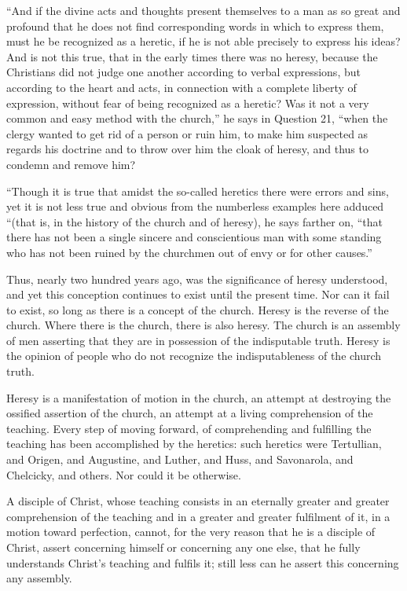 \documentclass{book}
\begin{document}
“And if the divine acts and thoughts present themselves to a man as so great and profound that he does not find corresponding words in which to express them, must he be recognized as a heretic, if he is not able precisely to express his ideas? And is not this true, that in the early times there was no heresy, because the Christians did not judge one another according to verbal expressions, but according to the heart and acts, in connection with a complete liberty of expression, without fear of being recognized as a heretic? Was it not a very common and easy method with the church,” he says in Question 21, “when the clergy wanted to get rid of a person or ruin him, to make him suspected as regards his doctrine and to throw over him the cloak of heresy, and thus to condemn and remove him?

“Though it is true that amidst the so-called heretics there were errors and sins, yet it is not less true and obvious from the numberless examples here adduced “(that is, in the history of the church and of heresy), he says farther on, “that there has not been a single sincere and conscientious man with some standing who has not been ruined by the churchmen out of envy or for other causes.”

Thus, nearly two hundred years ago, was the significance of heresy understood, and yet this conception continues to exist until the present time. Nor can it fail to exist, so long as there is a concept of the church. Heresy is the reverse of the church. Where there is the church, there is also heresy. The church is an assembly of men asserting that they are in possession of the indisputable truth. Heresy is the opinion of people who do not recognize the indisputableness of the church truth.

Heresy is a manifestation of motion in the church, an attempt at destroying the ossified assertion of the church, an attempt at a living comprehension of the teaching. Every step of moving forward, of comprehending and fulfilling the teaching has been accomplished by the heretics: such heretics were Tertullian, and Origen, and Augustine, and Luther, and Huss, and Savonarola, and Chelcicky, and others. Nor could it be otherwise.

A disciple of Christ, whose teaching consists in an eternally greater and greater comprehension of the teaching and in a greater and greater fulfilment of it, in a motion toward perfection, cannot, for the very reason that he is a disciple of Christ, assert concerning himself or concerning any one else, that he fully understands Christ’s teaching and fulfils it; still less can he assert this concerning any assembly.
\end{document}
